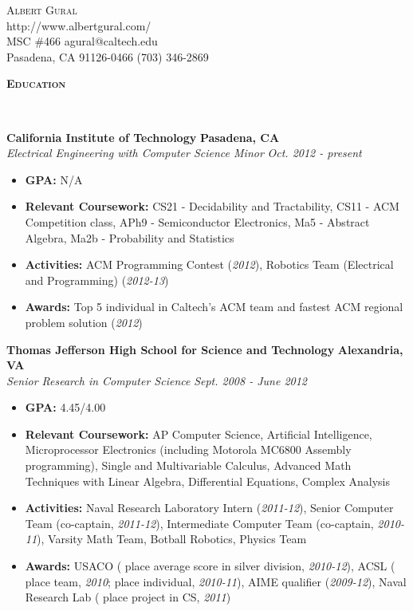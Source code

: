 \documentclass{article}
\newenvironment{changemargin}[2]{%
  \begin{list}{}{%
    \setlength{\topsep}{0pt}%
    \setlength{\leftmargin}{#1}%
    \setlength{\rightmargin}{#2}%
    \setlength{\listparindent}{\parindent}%
    \setlength{\itemindent}{\parindent}%
    \setlength{\parsep}{\parskip}%
  }%
  \item[]}{\end{list}
}
\newcommand{\lineover}{
	\begin{changemargin}{-0.05in}{-0.05in}
		\vspace*{-8pt}
		\hrulefill \\
		\vspace*{-2pt}
	\end{changemargin}
}
\newcommand{\header}[1]{
	\begin{changemargin}{-0.5in}{-0.5in}
		{\large \textbf{\scshape{#1}}}\\
  	\lineover
	\end{changemargin}
}
\newcommand{\contact}[6]{
	\begin{changemargin}{1in}{1in}
		\begin{center}
			{\LARGE \scshape {#1}}\\ \smallskip
			{#4}\\ \smallskip
			{#2} \hfill {#5}\\ \smallskip
			{#3} \hfill {#6}\\ \smallskip 
		\end{center}
	\end{changemargin}
}
\newenvironment{body} {
	\vspace*{-16pt}
	\begin{changemargin}{-0.25in}{-0.5in}
  }	
	{\end{changemargin}
}
\begin{document}
\contact{Albert Gural}{MSC \#466}{Pasadena, CA 91126-0466}{http://www.albertgural.com/}{agural@caltech.edu}{(703) 346-2869}


\header{Education}

\begin{body}
	\vspace{14pt}
	\textbf{California Institute of Technology} \hfill \textbf{Pasadena, CA}{} \\
	\emph{Electrical Engineering with Computer Science Minor} \hfill \emph{Oct. 2012 - present} \\
	\begin{itemize}%
	\item \textbf{GPA:} N/A
	\item \textbf{Relevant Coursework:} CS21 - Decidability and Tractability, CS11 - ACM Competition class, APh9 - Semiconductor Electronics, Ma5 - Abstract Algebra, Ma2b - Probability and Statistics
	\item \textbf{Activities:} ACM Programming Contest (\textit{2012}), Robotics Team (Electrical and Programming) (\textit{2012-13})
	\item \textbf{Awards:} Top 5 individual in Caltech's ACM team and fastest ACM regional problem solution (\textit{2012})
	\end{itemize}

\medskip

	\textbf{Thomas Jefferson High School for Science and Technology} \hfill \textbf{Alexandria, VA} \\
	\emph{Senior Research in Computer Science} \hfill \emph{Sept. 2008 - June 2012} \\
	\begin{itemize}%
	\item \textbf{GPA:} 4.45/4.00
	\item \textbf{Relevant Coursework:} AP Computer Science, Artificial Intelligence, Microprocessor Electronics (including Motorola MC6800 Assembly programming), Single and Multivariable Calculus, Advanced Math Techniques with Linear Algebra, Differential Equations, Complex Analysis
	\item \textbf{Activities:} Naval Research Laboratory Intern (\textit{2011-12}), Senior Computer Team (co-captain, \textit{2011-12}), Intermediate Computer Team (co-captain, \textit{2010-11}), Varsity Math Team, Botball Robotics, Physics Team
	\item \textbf{Awards:} USACO ( place average score in silver division, \textit{2010-12}), ACSL ( place team, \textit{2010};  place individual, \textit{2010-11}), AIME qualifier (\textit{2009-12}), Naval Research Lab ( place project in CS, \textit{2011})
	\end{itemize}
\end{body}
\end{document}

